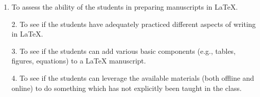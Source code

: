 \documentclass[18pt, a4paper]{extarticle} %
\begin{document}
	
	\begin{enumerate}
		\item \Large{To assess the ability of the students in preparing manuscripts in \LaTeX.}
		\item[\Large{2.}] \large{To see if the students have adequately practiced different aspects of
writing in \LaTeX.}
		\item[\large{3.}] \normalsize{To see if the students can add various basic components (e.g., tables, figures, equations) to a \LaTeX   
			manuscript.}
		
		\newpage
		
		\item[4.] To see if the students can leverage the available materials (both offline and online) to do
		something which has not explicitly been taught in the class.
		
	\end{enumerate}
	
	 
	 
\end{document}
